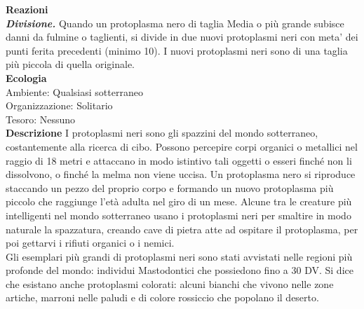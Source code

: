 \begin{multicols}{2}
\textbf{Reazioni}\\
\emph{\textbf{Divisione.}} Quando un protoplasma nero di taglia Media o più grande subisce danni da fulmine o taglienti, si divide in due nuovi protoplasmi neri con meta' dei punti ferita precedenti (minimo 10). I nuovi protoplasmi neri sono di una taglia più piccola di quella originale. \\
\textbf{Ecologia}\\
Ambiente: Qualsiasi sotterraneo\\
Organizzazione: Solitario\\
Tesoro: Nessuno\\
\textbf{Descrizione}
I protoplasmi neri sono gli spazzini del mondo sotterraneo, costantemente alla ricerca di cibo. Possono percepire corpi organici o metallici nel raggio di 18 metri e attaccano in modo istintivo tali oggetti o esseri finché non li dissolvono, o finché la melma non viene uccisa. Un protoplasma nero si riproduce staccando un pezzo del proprio corpo e formando un nuovo protoplasma più piccolo che raggiunge l’età adulta nel giro di un mese. Alcune tra le creature più intelligenti nel mondo sotterraneo usano i protoplasmi neri per smaltire in modo naturale la spazzatura, creando cave di pietra atte ad ospitare il protoplasma, per poi gettarvi i rifiuti organici o i nemici.\\
Gli esemplari più grandi di protoplasmi neri sono stati avvistati nelle regioni più profonde del mondo: individui Mastodontici che possiedono fino a 30 DV. Si dice che esistano anche protoplasmi colorati: alcuni bianchi che vivono nelle zone artiche, marroni nelle paludi e di colore rossiccio che popolano il deserto.\\



\end{multicols}
